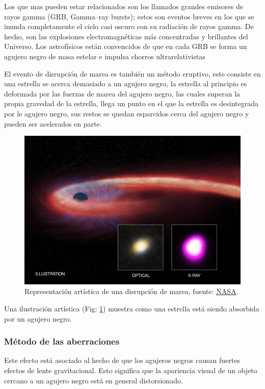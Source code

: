 \documentclass{article}
\begin{document}
Los que mas pueden estar relacionados son los llamados grandes emisores de rayos gamma (GRB, Gamma–ray bursts); estos son eventos breves en los que se inunda completamente el cielo casi oscuro con su radiación de rayos gamma. De hecho, son las explosiones electromagnéticas más concentradas y brillantes del Universo.\cite{meszaros2006gamma} Los astrofísicos están convencidos de que en cada GRB se forma un agujero negro de masa estelar e impulsa chorros ultrarelativistas\cite{muller2007experimental} 

El evento de disrupción de marea es también un método eruptivo, este consiste en una estrella se acerca demasiado a un agujero negro, la estrella al principio es deformada por las fuerzas de marea del agujero negro, las cuales superan la propia gravedad de la estrella, llega un punto en el que la estrella es desintegrada por le agujero negro, sus restos se quedan esparcidos cerca del agujero negro y pueden ser acelerados en parte.\cite{muller2007experimental}

\begin{figure}[H]
    \centering
    \includegraphics{Tidal disruption events NASA.jpg}
    \caption{Representación artística de una disrupción de marea, fuente: \href{https://www.nasa.gov/mission_pages/chandra/multimedia/artists-illustration-of-tidal-disruption-event.html}{NASA}.}
    \label{fig:Tidal disruption events NASA}
\end{figure}

Una ilustración artística (Fig: \ref{fig:Tidal disruption events NASA}) muestra como una estrella está siendo absorbida por un agujero negro.

\subsubsection{Método de las aberraciones}
Este efecto está asociado al hecho de que los agujeros negros causan fuertes efectos de lente gravitacional. Esto significa que la apariencia visual de un objeto cercano a un agujero negro está en general distorsionado.\cite{muller2007experimental}
\end{document}
